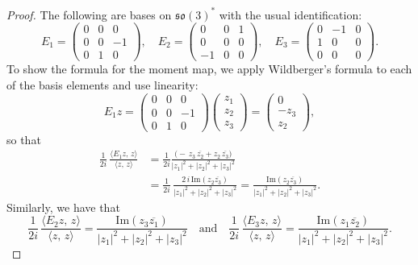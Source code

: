 \begin{proof}
The following are bases on $\mathfrak{so}(3)^{*}$ with the usual identification:
\begin{equation}
E_1 =
\begin{pmatrix}
0 & 0 & 0 \\
0 & 0 & -1 \\
0 & 1 & 0
\end{pmatrix},
\quad
E_2 =
\begin{pmatrix}
0 & 0 & 1 \\
0 & 0 & 0 \\
-1 & 0 & 0
\end{pmatrix},
\quad
E_3 =
\begin{pmatrix}
0 & -1 & 0 \\
1 & 0 & 0 \\
0 & 0 & 0
\end{pmatrix}.
\end{equation}
To show the formula for the moment map, we apply Wildberger's formula to each of the basis elements and use linearity: 
\begin{equation}
E_1 z =
\begin{pmatrix}
0 & 0 & 0 \\
0 & 0 & -1 \\
0 & 1 & 0
\end{pmatrix}
\begin{pmatrix}
z_1 \\[6pt]
z_2 \\[6pt]
z_3
\end{pmatrix}
=
\begin{pmatrix}
0 \\ -z_3 \\ z_2
\end{pmatrix},
\end{equation}
so that
\begin{align}
\frac{1}{2i}\,\frac{\langle E_1 z,\,z\rangle}{\langle z,\,z\rangle}
&=
\frac{1}{2i}
\frac{\bigl(-\,z_3\,\overline{z_2} + z_2\,\overline{z_3}\bigr)}%
     {|z_1|^2 + |z_2|^2 + |z_3|^2} \\&=
\frac{1}{2i}\,\frac{2\,i\,\mathrm{Im}(z_2 \overline{z_3})}{|z_1|^2 + |z_2|^2 + |z_3|^2} =
\frac{\mathrm{Im}(z_2 \overline{z_3})}{|z_1|^2 + |z_2|^2 + |z_3|^2}.
\end{align}
Similarly, we have that
\begin{equation}
\frac{1}{2i}\,\frac{\langle E_2 z,\,z\rangle}{\langle z,\,z\rangle} =
\frac{\mathrm{Im}(z_3 \overline{z_1})}{|z_1|^2 + |z_2|^2 + |z_3|^2}
\quad\text{and}\quad
\frac{1}{2i}\,\frac{\langle E_3 z,\,z\rangle}{\langle z,\,z\rangle} =
\frac{\mathrm{Im}(z_1 \overline{z_2})}{|z_1|^2 + |z_2|^2 + |z_3|^2}.
\end{equation}
\end{proof}


